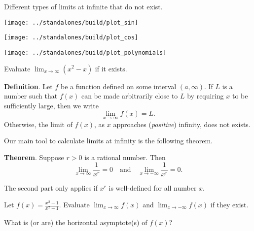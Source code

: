 \documentclass[../main.tex]{subfiles}
\begin{document}
\begin{example}
  Different types of limits at infinite that do not exist.

  \begin{minipage}{.4\textwidth}
    \centering
    \texttt{[image: ../standalones/build/plot\_sin]}
  \end{minipage}
  \bigskip

  \begin{minipage}{.4\textwidth}
    \centering
    \texttt{[image: ../standalones/build/plot\_cos]}
  \end{minipage}
  \bigskip

  \begin{minipage}{.4\textwidth}
    \centering
    \texttt{[image: ../standalones/build/plot\_polynomials]}
  \end{minipage}
  \bigskip
\end{example}

\begin{example}
  Evaluate \(\lim_{x \to \infty} (x^{2} - x)\) if it exists.
\end{example}
\clearpage

\begin{mdframed}[style=withref]
  \textbf{Definition}. Let \(f\) be a function defined on some interval \((a,\infty)\). If \(L\) is a number such that \(f(x)\) can be made arbitrarily close to \(L\) by requiring \(x\) to be sufficiently large, then we write
  \[ 
    \lim_{x \to \infty} f(x) = L.
  \]
  Otherwise, the limit of \(f(x)\), as \(x\) approaches (\emph{positive}) infinity, does not exists.

\end{mdframed}

Our main tool to calculate limits at infinity is the following theorem.
\begin{mdframed}[style=withref]
  \textbf{Theorem}. Suppose \(r > 0\) is a rational number. Then
  \[
    \lim_{x \to \infty} \frac{1}{x^{r}} = 0 \quad\text{and}\quad \lim_{x \to -\infty} \frac{1}{x^{r}} = 0.
  \]

  The second part only applies if \(x^{r}\) is well-defined for all number \(x\).

\end{mdframed}

\begin{example}
  Let \(f(x) = \frac{x^{2}-1}{x^{2} + 1}\). 
  Evaluate \(\lim_{x \to \infty} f(x)\) and \(\lim_{x \to -\infty} f(x)\) if they exist. 

  What is (or are) the horizontal asymptote(s) of \(f(x)\)?
\end{example}
\vfill
\end{document}
